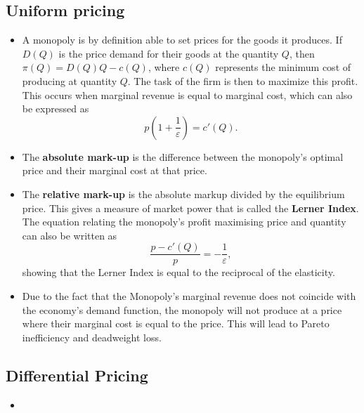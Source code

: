 \documentclass[a4paper]{article}
\begin{document}
\subsection{Uniform pricing}
\begin{itemize}
    \item A monopoly is by definition able to set prices for the goods it produces. If $D(Q)$ is the price demand for their goods at the quantity $Q$, then $\pi(Q) = D(Q)Q - c(Q)$, where $c(Q)$ represents the minimum cost of producing at quantity $Q$. The task of the firm is then to maximize this profit. This occurs when marginal revenue is equal to marginal cost, which can also be expressed as $$p(1+ \frac{1}{\varepsilon}) = c'(Q).$$
    \item The \textbf{absolute mark-up} is the difference between the monopoly's optimal price and their marginal cost at that price. 
    \item The \textbf{relative mark-up} is the absolute markup divided by the equilibrium price. This gives a measure of market power that is called the \textbf{Lerner Index}. The equation relating the monopoly's profit maximising price and quantity can also be written as $$\frac{p - c'(Q)}{p} = -\frac{1}{\varepsilon},$$ showing that the Lerner Index is equal to the reciprocal of the elasticity.
    \item Due to the fact that the Monopoly's marginal revenue does not coincide with the economy's demand function, the monopoly will not produce at a price where their marginal cost is equal to the price. This will lead to Pareto inefficiency and deadweight loss. 
\end{itemize}

\subsection{Differential Pricing}
\begin{itemize}
    \item 
\end{itemize}
\end{document}
